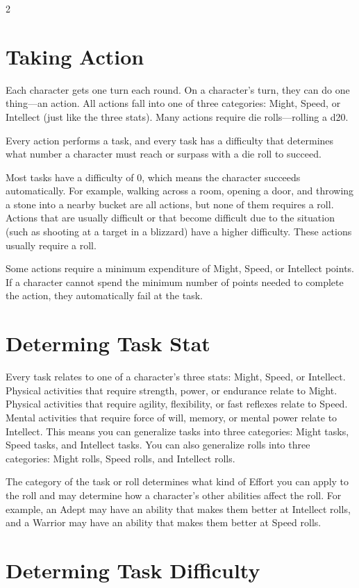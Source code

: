 \begin{multicols}{2}
\section{Taking Action}
Each character gets one turn each round. On a character’s turn, they can do one thing—an action. All actions fall into one of three categories: Might, Speed, or Intellect (just like the three stats). Many actions require die rolls—rolling a d20.

Every action performs a task, and every task has a difficulty that determines what number a character must reach or surpass with a die roll to succeed.

Most tasks have a difficulty of 0, which means the character succeeds automatically. For example, walking across a room, opening a door, and throwing a stone into a nearby bucket are all actions, but none of them requires a roll. Actions that are usually difficult or that become difficult due to the situation (such as shooting at a target in a blizzard) have a higher difficulty. These actions usually require a roll.

Some actions require a minimum expenditure of Might, Speed, or Intellect points. If a character cannot spend the minimum number of points needed to complete the action, they automatically fail at the task.

\section{Determing Task Stat}

Every task relates to one of a character’s three stats: Might, Speed, or Intellect. Physical activities that require strength, power, or endurance relate to Might. Physical activities that require agility, flexibility, or fast reflexes relate to Speed. Mental activities that require force of will, memory, or mental power relate to Intellect. This means you can generalize tasks into three categories: Might tasks, Speed tasks, and Intellect tasks. You can also generalize rolls into three categories: Might rolls, Speed rolls, and Intellect rolls.

The category of the task or roll determines what kind of Effort you can apply to the roll and may determine how a character’s other abilities affect the roll. For example, an Adept may have an ability that makes them better at Intellect rolls, and a Warrior may have an ability that makes them better at Speed rolls.

\section{Determing Task Difficulty}


\end{multicols}
